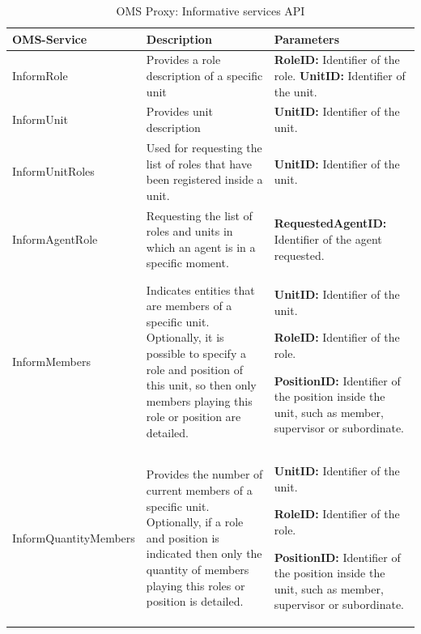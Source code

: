 \begin{table}[h!t]
\begin{tabular}{|l|p{5cm}|p{5cm}|}
\hline
OMS-Service & Description & Parameters \\ \hline

InformRole & Provides a role description of a specific unit
&

\textbf{RoleID:} Identifier of the role.
\textbf{UnitID:} Identifier of the unit.

\\ \hline

InformUnit & Provides unit description
&

\textbf{UnitID:} Identifier of the unit.

\\ \hline

InformUnitRoles & Used for requesting the list of roles that have been registered inside a unit.
&

\textbf{UnitID: }Identifier of the unit.

\\ \hline


InformAgentRole & Requesting the list of roles and units in which an agent is in a specific moment.
&

\textbf{RequestedAgentID: } Identifier of the agent requested.

\\ \hline
InformMembers & Indicates entities that are members of a specific unit. Optionally, it is possible to specify a role and position of this unit, so then only members playing this role or position are detailed.
 &

\textbf{UnitID:} Identifier of the unit.

\textbf{RoleID:} Identifier of the role.

\textbf{PositionID:} Identifier of the position inside the unit, such as member, supervisor or subordinate.

\\ \hline
 InformQuantityMembers & Provides the number of current members of a specific unit. Optionally, if a role and position is indicated then only the quantity of members playing this roles or position is detailed.
 &

\textbf{UnitID:} Identifier of the unit.

\textbf{RoleID:} Identifier of the role.

\textbf{PositionID:} Identifier of the position inside the unit, such as member, supervisor or subordinate.

\\ \hline

\end{tabular}
\caption{OMS Proxy: Informative services API}
\label{tab:thomas_OMSProxy_information}
\end{table}


